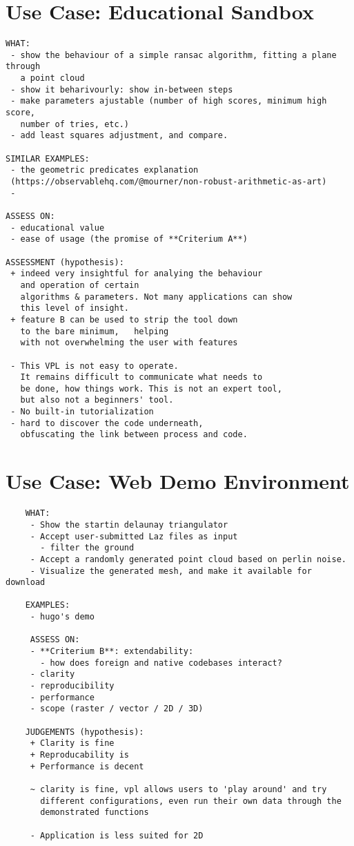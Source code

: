 
\section{Use Case: Educational Sandbox}
\begin{lstlisting}
WHAT: 
 - show the behaviour of a simple ransac algorithm, fitting a plane through 
   a point cloud
 - show it beharivourly: show in-between steps
 - make parameters ajustable (number of high scores, minimum high score, 
   number of tries, etc.)
 - add least squares adjustment, and compare.

SIMILAR EXAMPLES: 
 - the geometric predicates explanation 
 (https://observablehq.com/@mourner/non-robust-arithmetic-as-art)
 - 

ASSESS ON: 
 - educational value
 - ease of usage (the promise of **Criterium A**)
 
ASSESSMENT (hypothesis): 
 + indeed very insightful for analying the behaviour 
   and operation of certain 
   algorithms & parameters. Not many applications can show 
   this level of insight. 
 + feature B can be used to strip the tool down 
   to the bare minimum,   helping 
   with not overwhelming the user with features

 - This VPL is not easy to operate. 
   It remains difficult to communicate what needs to 
   be done, how things work. This is not an expert tool, 
   but also not a beginners' tool.
 - No built-in tutorialization
 - hard to discover the code underneath, 
   obfuscating the link between process and code.

\end{lstlisting}

\section{Use Case: Web Demo Environment}
\begin{lstlisting}
    WHAT:
     - Show the startin delaunay triangulator
     - Accept user-submitted Laz files as input
       - filter the ground
     - Accept a randomly generated point cloud based on perlin noise.
     - Visualize the generated mesh, and make it available for download

    EXAMPLES: 
     - hugo's demo
    
     ASSESS ON:
     - **Criterium B**: extendability: 
       - how does foreign and native codebases interact? 
     - clarity
     - reproducibility
     - performance
     - scope (raster / vector / 2D / 3D)

    JUDGEMENTS (hypothesis): 
     + Clarity is fine
     + Reproducability is 
     + Performance is decent

     ~ clarity is fine, vpl allows users to 'play around' and try
       different configurations, even run their own data through the
       demonstrated functions

     - Application is less suited for 2D 
    
\end{lstlisting}


